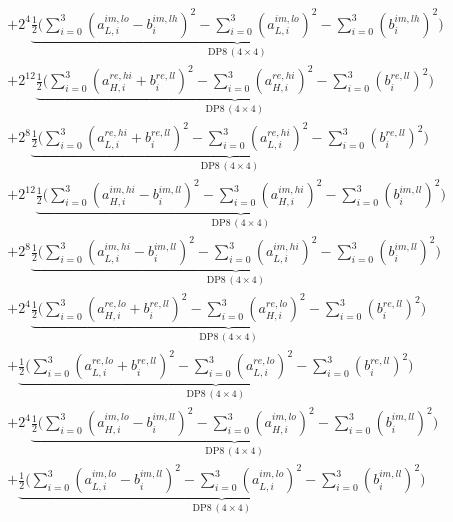 \documentclass[fleqn]{article}
\newcommand{\DPop}[3]{\mathrm{DP#1}\,(#2\!\times\!#3)}
\begin{document}
\begin{align*}
  & + 2^{4}\underbrace{\tfrac{1}{2}\Big(\sum_{i=0}^{3}(a_{L,i}^{im,lo}{-}b_i^{im,lh})^2 - \sum_{i=0}^{3}(a_{L,i}^{im,lo})^2 - \sum_{i=0}^{3}(b_i^{im,lh})^2\Big)}_{\DPop{8}{4}{4}} \\[0.5em]
  & + 2^{12}\underbrace{\tfrac{1}{2}\Big(\sum_{i=0}^{3}(a_{H,i}^{re,hi}{+}b_i^{re,ll})^2 - \sum_{i=0}^{3}(a_{H,i}^{re,hi})^2 - \sum_{i=0}^{3}(b_i^{re,ll})^2\Big)}_{\DPop{8}{4}{4}} \\[0.5em]
  & + 2^{8}\underbrace{\tfrac{1}{2}\Big(\sum_{i=0}^{3}(a_{L,i}^{re,hi}{+}b_i^{re,ll})^2 - \sum_{i=0}^{3}(a_{L,i}^{re,hi})^2 - \sum_{i=0}^{3}(b_i^{re,ll})^2\Big)}_{\DPop{8}{4}{4}} \\[0.5em]
  & + 2^{12}\underbrace{\tfrac{1}{2}\Big(\sum_{i=0}^{3}(a_{H,i}^{im,hi}{-}b_i^{im,ll})^2 - \sum_{i=0}^{3}(a_{H,i}^{im,hi})^2 - \sum_{i=0}^{3}(b_i^{im,ll})^2\Big)}_{\DPop{8}{4}{4}} \\[0.5em]
  & + 2^{8}\underbrace{\tfrac{1}{2}\Big(\sum_{i=0}^{3}(a_{L,i}^{im,hi}{-}b_i^{im,ll})^2 - \sum_{i=0}^{3}(a_{L,i}^{im,hi})^2 - \sum_{i=0}^{3}(b_i^{im,ll})^2\Big)}_{\DPop{8}{4}{4}} \\[0.5em]
  & + 2^{4}\underbrace{\tfrac{1}{2}\Big(\sum_{i=0}^{3}(a_{H,i}^{re,lo}{+}b_i^{re,ll})^2 - \sum_{i=0}^{3}(a_{H,i}^{re,lo})^2 - \sum_{i=0}^{3}(b_i^{re,ll})^2\Big)}_{\DPop{8}{4}{4}} \\[0.5em]
  & + \underbrace{\tfrac{1}{2}\Big(\sum_{i=0}^{3}(a_{L,i}^{re,lo}{+}b_i^{re,ll})^2 - \sum_{i=0}^{3}(a_{L,i}^{re,lo})^2 - \sum_{i=0}^{3}(b_i^{re,ll})^2\Big)}_{\DPop{8}{4}{4}} \\[0.5em]
  & + 2^{4}\underbrace{\tfrac{1}{2}\Big(\sum_{i=0}^{3}(a_{H,i}^{im,lo}{-}b_i^{im,ll})^2 - \sum_{i=0}^{3}(a_{H,i}^{im,lo})^2 - \sum_{i=0}^{3}(b_i^{im,ll})^2\Big)}_{\DPop{8}{4}{4}} \\[0.5em]
  & + \underbrace{\tfrac{1}{2}\Big(\sum_{i=0}^{3}(a_{L,i}^{im,lo}{-}b_i^{im,ll})^2 - \sum_{i=0}^{3}(a_{L,i}^{im,lo})^2 - \sum_{i=0}^{3}(b_i^{im,ll})^2\Big)}_{\DPop{8}{4}{4}}
\end{align*}
\end{document}
